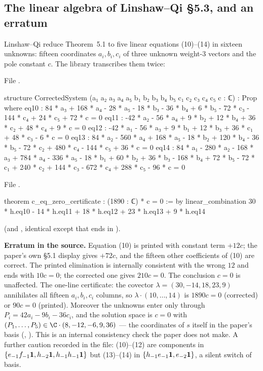 \subsection{The linear algebra of Linshaw--Qi \S5.3, and an erratum}

Linshaw--Qi reduce Theorem~5.1 to five linear equations (10)--(14) in sixteen unknowns: fifteen
coordinates $a_i,b_i,c_i$ of three unknown weight-3 vectors and the pole constant $c$. The library
transcribes them twice:

\noindent File .
\begin{leancode}
structure CorrectedSystem (a₁ a₂ a₃ a₄ a₅ b₁ b₂ b₃ b₄ b₅ c₁ c₂ c₃ c₄ c₅ c : ℂ) : Prop where
  eq10 : 84 * a₃ + 168 * a₄ - 28 * a₅ - 18 * b₃ - 36 * b₄ + 6 * b₅
      - 72 * c₃ - 144 * c₄ + 24 * c₅ + 72 * c = 0
  eq11 : -42 * a₂ - 56 * a₄ + 9 * b₂ + 12 * b₄ + 36 * c₂ + 48 * c₄ + 9 * c = 0
  eq12 : -42 * a₁ - 56 * a₃ + 9 * b₁ + 12 * b₃ + 36 * c₁ + 48 * c₃ - 6 * c = 0
  eq13 : 84 * a₂ - 560 * a₄ + 168 * a₅ - 18 * b₂ + 120 * b₄ - 36 * b₅
      - 72 * c₂ + 480 * c₄ - 144 * c₅ + 36 * c = 0
  eq14 : 84 * a₁ - 280 * a₂ - 168 * a₃ + 784 * a₄ - 336 * a₅ - 18 * b₁ + 60 * b₂ + 36 * b₃
      - 168 * b₄ + 72 * b₅ - 72 * c₁ + 240 * c₂ + 144 * c₃ - 672 * c₄ + 288 * c₅ - 96 * c = 0
\end{leancode}
\noindent File .
\begin{leancode}
theorem c_eq_zero_certificate : (1890 : ℂ) * c = 0 := by
  linear_combination 30 * h.eq10 - 14 * h.eq11 + 18 * h.eq12 + 23 * h.eq13 + 9 * h.eq14
\end{leancode}
(and , identical except that  ends in ).

\begin{warning}
\textbf{Erratum in the source.} Equation (10) is printed with constant term $+12c$; the paper's own
\S5.1 display gives $+72c$, and the fifteen other coefficients of (10) are correct. The printed
elimination is internally consistent with the wrong $12$ and ends with $10c = 0$; the corrected one
gives $210c=0$. The conclusion $c=0$ is unaffected. The one-line certificate: the covector
$\lambda = (30,-14,18,23,9)$ annihilates all fifteen $a_i,b_i,c_i$ columns, so $\lambda\cdot(10,\ldots,14)$
is $1890c = 0$ (corrected) or $90c=0$ (printed). Moreover the unknowns enter only through
$P_i = 42a_i - 9b_i - 36c_i$, and the solution space is $c=0$ with $(P_1,\ldots,P_5)\in\C\cdot(8,-12,-6,9,36)$
--- the coordinates of $s$ itself in the paper's basis (,
). This is an internal consistency check the paper does not make. A
further caution recorded in the file: (10)--(12) are components in $\{e_{-1}f_{-1}\mathbf{1}, h_{-2}\mathbf{1},
h_{-1}h_{-1}\mathbf{1}\}$ but (13)--(14) in $\{h_{-1}e_{-1}\mathbf{1}, e_{-2}\mathbf{1}\}$, a silent switch of basis.
\end{warning}

